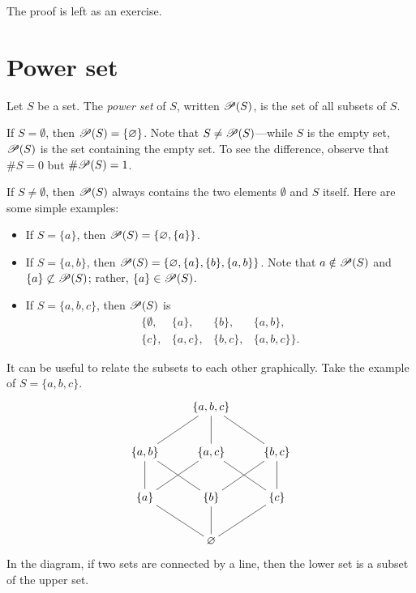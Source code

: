 \documentclass{tufte-book}
\begin{document}
The proof is left as an exercise.



\section{Power set}
\label{sec:power-set}

\begin{definition}
  Let $S$ be a set. The \emph{power set} of $S$, written $\mathscr{P}(S)$,  is the set of all subsets of $S$.
\end{definition}
If $S = \emptyset$, then $\mathscr{P}(S) = \{\varnothing\}$. Note that $S \neq \mathscr{P}(S)$---while $S$ is the empty set, $\mathscr{P}(S)$ is the set containing the empty set. To see the difference, observe that $\# S = 0$ but $\# \mathscr{P}(S) = 1$.

If $S \neq \emptyset$, then $\mathscr{P}(S)$ always contains the two elements $\emptyset$ and $S$ itself. Here are some simple examples:
\begin{itemize}
    \item If $S = \{a\}$, then $\mathscr{P}(S) = \{\varnothing, \{a\}\}$.
    \item If $S = \{a, b\}$, then $\mathscr{P}(S) = \{\varnothing, \{a\}, \{b\}, \{a, b\}\}$. Note that $a \notin \mathscr{P}(S)$ and $\{a\} \not\subset \mathscr{P}(S)$; rather, $\{a\} \in \mathscr{P}(S)$.
    \item If $S = \{a, b, c\}$, then $\mathscr{P}(S)$ is
  \[
  \begin{array}{cccc}
    \{\emptyset, & \{a\}, & \{b\}, & \{a, b\}, \\
    \{c\}, & \{a, c\}, & \{b, c\}, & \{a, b, c\}\}.
  \end{array}
  \]
\end{itemize}
It can be useful to relate the subsets to each other graphically. Take the example of $S = \{a, b, c\}$. 
\[
\xymatrix{
  & \{a, b, c\} \ar@{-}[dl] \ar@{-}[d] \ar@{-}[dr] & \\
  \{a, b\} \ar@{-}[d] \ar@{-}[dr] & \{a, c\} \ar@{-}[dl] \ar@{-}[dr] & \{b, c\} \ar@{-}[dl] \ar@{-}[d]\\
  \{a\} \ar@{-}[dr] & \{b\} \ar@{-}[d] & \{c\} \ar@{-}[dl] \\
  & \emptyset &
}
\]
In the diagram, if two sets are connected by a line, then the lower set is a subset of the upper set.
\end{document}
